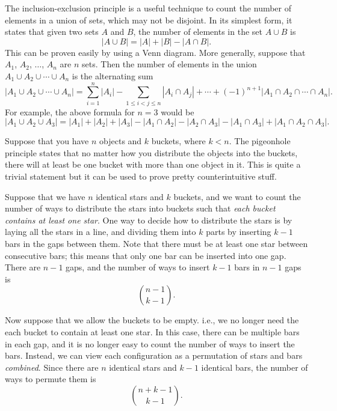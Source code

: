 \begin{theorem}
    \label{thm: incluexclu}
    The inclusion-exclusion principle is a useful technique to count the number
    of elements in a union of sets, which may not be disjoint. In its
    simplest form, it states that given two sets $A$ and $B$, the number of
    elements in the set $A \cup B$ is
    \[ |A \cup B| = |A| + |B| - |A \cap B|. \]
    This can be proven easily by using a Venn diagram. More generally,
    suppose that $A_1$, $A_2$, $\ldots$, $A_n$ are $n$ sets. Then the number of
    elements in the union $A_1 \cup A_2 \cup \cdots \cup A_n$ is the alternating
    sum
    \[ |A_1 \cup A_2 \cup \cdots \cup A_n| = \sum_{i = 1}^n |A_i| - \sum_{1 \leq
        i < j \leq n} |A_i \cap A_j| + \cdots + (-1)^{n + 1} |A_1 \cap A_2 \cap
    \cdots \cap A_n|. \]
    For example, the above formula for $n = 3$ would be
    \[ |A_1 \cup A_2 \cup A_3| = |A_1| + |A_2| + |A_3| - |A_1 \cap A_2| - |A_2
    \cap A_3| - |A_1 \cap A_3| + |A_1 \cap A_2 \cap A_3|. \]
\end{theorem}
\begin{theorem}
    \label{thm: pigeonhole}
    Suppose that you have $n$ objects and $k$ buckets, where $k < n$. The
    pigeonhole principle states that no matter how you distribute the objects
    into the buckets, there will at least be one bucket with more than one
    object in it. This is quite a trivial statement but it can be used to prove
    pretty counterintuitive stuff.
\end{theorem}
\begin{technique}
    \label{teq: starsandbars}
    Suppose that we have $n$ identical stars and $k$ buckets, and we want to
    count the number of ways to distribute the stars into buckets such that
    \emph{each bucket contains at least one star}. One way to decide how to
    distribute the stars is by laying all the stars in a line, and dividing them
    into $k$ parts by inserting $k - 1$ bars in the gaps between them. Note that
    there must be at least one star between consecutive bars; this means that
    only one bar can be inserted into one gap. There are $n - 1$ gaps, and the
    number of ways to insert $k - 1$ bars in $n - 1$ gaps is
    \[ \binom{n - 1}{k - 1}. \]

    Now suppose that we allow the buckets to be empty. i.e., we no longer need
    the each bucket to contain at least one star. In this case, there can be
    multiple bars in each gap, and it is no longer easy to count the number of
    ways to insert the bars. Instead, we can view each configuration as a
    permutation of stars and bars \emph{combined}. Since there are $n$ identical
    stars and $k - 1$ identical bars, the number of ways to permute them is
    \[ \binom{n + k - 1}{k - 1}. \]
\end{technique}
